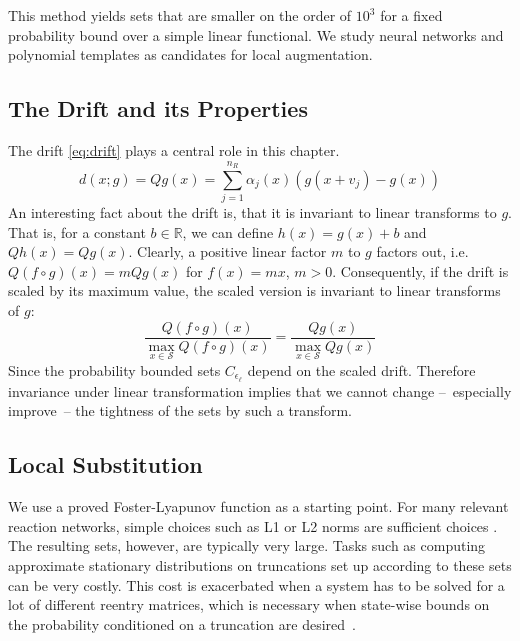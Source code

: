 This method yields sets that are smaller on the order of $10^3$ for a fixed probability bound over a simple linear functional.
We study neural networks and polynomial templates as candidates for local augmentation.

\subsection{The Drift and its Properties}
The drift \eqref{eq:drift} plays a central role in this chapter.
\begin{equation}
	d(x; g) = Qg(x) = \sum_{j=1}^{n_R} \alpha_j(x) (g(x+v_j) -  g(x))
\end{equation}
An interesting fact about the drift is, that it is invariant to linear transforms to $g$.
That is, for a constant $b\in\mathbb{R}$, we can define $h(x)=g(x)+b$ and \( Qh(x) =Qg(x)\).
Clearly, a positive linear factor $m$ to $g$ factors out, i.e.\ $Q(f\circ g)(x)=mQg(x)$ for $f(x) = mx$, $m>0$.
Consequently, if the drift is scaled by its maximum value, the scaled version is invariant to linear
transforms of $g$:
\begin{equation}
	\frac{Q(f\circ g)(x)}{\max_{x\in\mathcal{S}}Q(f \circ g)(x)}
	=
	\frac{Qg(x)}{\max_{x\in\mathcal{S}}Qg(x)}
\end{equation}
Since the probability bounded sets $C_{\epsilon_{\ell}}$ depend on the scaled drift.
Therefore invariance under linear transformation implies that we cannot change --~especially improve~-- the tightness of the sets by such a transform.

\subsection{Local Substitution}
We use a proved Foster-Lyapunov function as a starting point.
For many relevant reaction networks, simple choices such as L1 or L2 norms are sufficient choices \parencite{spieler2014numerical}.
The resulting sets, however, are typically very large.
Tasks such as computing approximate stationary distributions on truncations set up according to these sets can be very costly.
This cost is exacerbated when a system has to be solved for a lot of different reentry matrices, which is necessary when state-wise bounds on the probability conditioned on a truncation are desired~\parencite{dayar2011bounding}.

